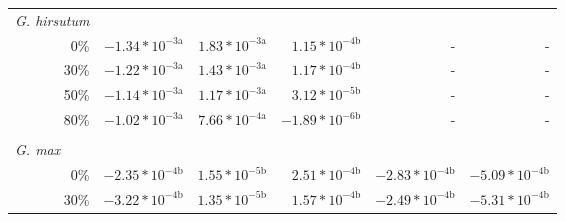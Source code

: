 \begin{landscape}
\begin{table}
{\begin{tabular}{p{2cm}p{3.2cm}p{3.2cm}p{3.2cm}p{3.2cm}p{3.2cm}}
            \multicolumn{1}{l}{\textit{G. hirsutum}} \\
            \multicolumn{1}{r}{0\%}
            &  \multicolumn{1}{r}{\textbf{$-1.34*10^{-3\mathrm{a}}$}}
            &  \multicolumn{1}{r}{\textbf{$1.83*10^{-3\mathrm{a}}$}}
            &  \multicolumn{1}{r}{\textbf{$1.15*10^{-4\mathrm{b}}$}}
            &  \multicolumn{1}{r}{-}
            &  \multicolumn{1}{r}{-}
            \\
            \multicolumn{1}{r}{30\%}                     
            &  \multicolumn{1}{r}{\textbf{$-1.22*10^{-3\mathrm{a}}$}}
            &  \multicolumn{1}{r}{\textbf{$1.43*10^{-3\mathrm{a}}$}}
            &  \multicolumn{1}{r}{\textbf{$1.17*10^{-4\mathrm{b}}$}}
            &  \multicolumn{1}{r}{-}
            &  \multicolumn{1}{r}{-}
            \\
            \multicolumn{1}{r}{50\%}
            &  \multicolumn{1}{r}{\textbf{$-1.14*10^{-3\mathrm{a}}$}}
            &  \multicolumn{1}{r}{\textbf{$1.17*10^{-3\mathrm{a}}$}}
            &  \multicolumn{1}{r}{$3.12*10^{-5\mathrm{b}}$}
            &  \multicolumn{1}{r}{-}
            &  \multicolumn{1}{r}{-}
            \\
            \multicolumn{1}{r}{80\%}
            &  \multicolumn{1}{r}{\textbf{$-1.02*10^{-3\mathrm{a}}$}}
            &  \multicolumn{1}{r}{\textbf{$7.66*10^{-4\mathrm{a}}$}}
            &  \multicolumn{1}{r}{$-1.89*10^{-6\mathrm{b}}$}
            &  \multicolumn{1}{r}{-}
            &  \multicolumn{1}{r}{-}
            \\
            &&&& 
            \\
            \multicolumn{1}{l}{\textit{G. max}}
            \\
            \multicolumn{1}{r}{0\%}
            &  \multicolumn{1}{r}{$-2.35*10^{-4\mathrm{b}}$}
            &  \multicolumn{1}{r}{\textbf{$1.55*10^{-5\mathrm{b}}$}}
            &  \multicolumn{1}{r}{\textbf{$2.51*10^{-4\mathrm{b}}$}}
            &  \multicolumn{1}{r}{\textbf{$-2.83*10^{-4\mathrm{b}}$}}
            &  \multicolumn{1}{r}{\textbf{$-5.09*10^{-4\mathrm{b}}$}}
            \\
              
            \multicolumn{1}{r}{30\%}
            &  \multicolumn{1}{r}{\textbf{$-3.22*10^{-4\mathrm{b}}$}}
            &  \multicolumn{1}{r}{\textbf{$1.35*10^{-5\mathrm{b}}$}}
            &  \multicolumn{1}{r}{\textbf{$1.57*10^{-4\mathrm{b}}$}}
            &  \multicolumn{1}{r}{\textbf{$-2.49*10^{-4\mathrm{b}}$}}
            &  \multicolumn{1}{r}{\textbf{$-5.31*10^{-4\mathrm{b}}$}}
            \\
              

\end{tabular}}
\end{table}
\end{landscape}
